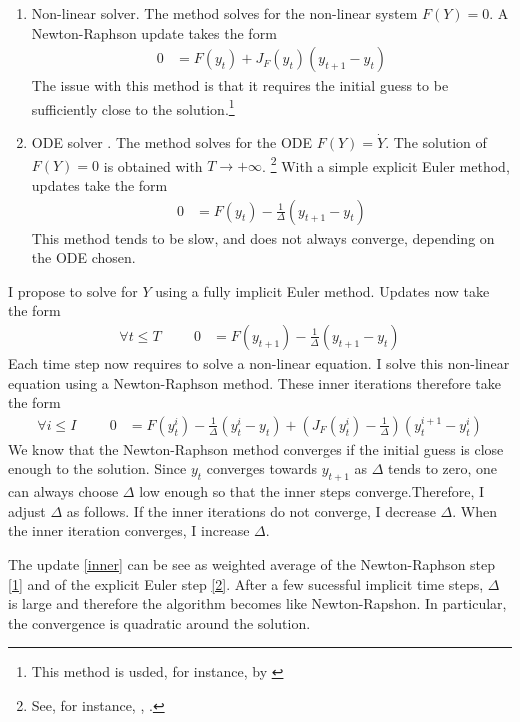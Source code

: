 \documentclass[english]{article}
\begin{document}
	\begin{enumerate}
		\item Non-linear solver. The method solves for the non-linear system $F (Y ) = 0$. A Newton-Raphson update takes the form
		\begin{align}\label{1}
			0 &= F(y_{t}) + J_{F}(y_t) (y_{t+1} - y_t)
		\end{align}
		The issue with this method is that it requires the initial guess to be sufficiently close to the solution.\footnote{This method is usded, for instance, by \citet{garleanu2015young}}
		\item ODE solver . The method solves for the ODE $F(Y) = \dot{Y}$. The solution of $F(Y)=0$ is obtained with $T\rightarrow +\infty$. \footnote{See, for instance, \citet{ditellabalance}, \citet{silva2015risk}.}
		With a simple explicit Euler method, updates take the form
		\begin{align}\label{2}
			0&= F(y_t) - \frac{1}{\Delta} (y_{t+1} -y_{t})
		\end{align}
		This method tends to be slow, and does not always converge, depending on the ODE chosen.
	\end{enumerate}
	I propose to solve for $Y$ using a fully implicit Euler method.  Updates now take the form 
	\begin{align*}
		\forall t \leq T \hspace{1cm} 0&= F(y_{t+1}) - \frac{1}{\Delta}(y_{t+1} -y_{t})
	\end{align*}
	Each time step now requires to solve a non-linear equation. I solve this non-linear equation using a Newton-Raphson method. These inner iterations therefore take the form
	\begin{align}\label{inner}
		\forall i \leq I \hspace{1cm}	0 &= F(y_{t}^i) - \frac{1}{\Delta}(y_{t}^{i} -y_{t}) + (J_{F}(y_t^i) -  \frac{1}{\Delta})(y^{i+1}_{t} - y_t^i)
	\end{align}
	We know that the Newton-Raphson method converges if the initial guess is close enough to the solution. Since $y_{t}$ converges towards $y_{t+1}$ as $\Delta$ tends to zero, one can always choose $\Delta$ low enough so that the inner steps converge.Therefore, I adjust $\Delta$ as follows. If the inner iterations do not converge, I decrease $\Delta$. When the inner iteration converges, I increase $\Delta$. \par
	The update \cref{inner} can be see as weighted average of the Newton-Raphson step \cref{1} and of the explicit Euler step \cref{2}.  After a few sucessful implicit time steps, $\Delta$ is large and therefore the algorithm becomes like Newton-Rapshon. In particular, the convergence is quadratic around the solution. \par
\end{document}
